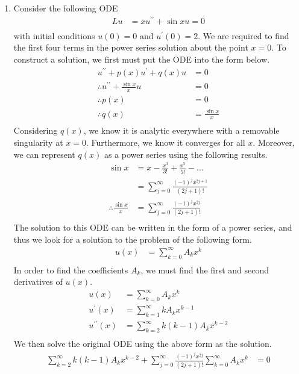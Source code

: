 \documentclass[a4paper]{article}
\newcommand{\ds}{\displaystyle}
\begin{document}
\begin{enumerate}
	\item Consider the following ODE
	\begin{align*}
		Lu & = xu^{\prime\prime} + \sin{x}u = 0\\
	\end{align*}
	with initial conditions $\ds{u(0) = 0}$ and $\ds{u^{\prime}(0) = 2}$. We are required to find the first four terms in the power series solution about the point $\ds{x=0}$. To construct a solution, we first must put the ODE into the form below.
	\begin{align*}
		u^{\prime\prime} + p(x)u^{\prime} + q(x)u & = 0\\
		\therefore u^{\prime\prime} + \frac{\sin{x}}{x}u & = 0\\
		\therefore p(x) & = 0\\
		\therefore q(x) & = \frac{\sin{x}}{x}\\
	\end{align*}
	Considering $\ds{q(x)}$, we know it is analytic everywhere with a removable singularity at $\ds{x=0}$. Furthermore, we know it converges for all $\ds{x}$. Moreover, we can represent $\ds{q(x)}$ as a power series using the following results.
	\begin{align*}
		\sin{x} & = x - \frac{x^3}{3!} + \frac{x^5}{5!} - \dots\\
		& = \sum^{\infty}_{j=0}\frac{(-1)^jx^{2j+1}}{(2j+1)!}\\
		\therefore \frac{\sin{x}}{x} & = \sum^{\infty}_{j=0}\frac{(-1)^jx^{2j}}{(2j+1)!}\\
	\end{align*}
	The solution to this ODE can be written in the form of a power series, and thus we look for a solution to the problem of the following form.
	\begin{align*}
		u(x) & = \sum^{\infty}_{k=0}A_kx^k \\
	\end{align*}
	In order to find the coefficients $\ds{A_k}$, we must find the first and second derivatives of $\ds{u(x)}$.
	\begin{align*}
		u(x) & = \sum^{\infty}_{k=0}A_kx^k \\
		u^{\prime}(x) & = \sum^{\infty}_{k=1}kA_kx^{k-1} \\
		u^{\prime\prime}(x) & = \sum^{\infty}_{k=2}k(k-1)A_kx^{k-2} \\
	\end{align*}
	We then solve the original ODE using the above form as the solution.
	\begin{align*}
		\sum^{\infty}_{k=2}k(k-1)A_kx^{k-2} + \sum^{\infty}_{j=0}\frac{(-1)^jx^{2j}}{(2j+1)!}\sum^{\infty}_{k=0}A_kx^k & = 0\\

\end{align*}
\end{enumerate}
\end{document}
